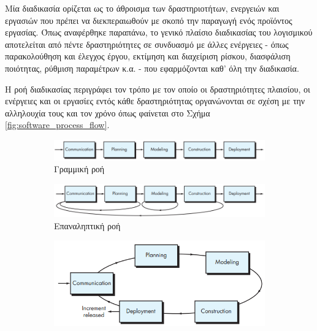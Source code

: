 Μία διαδικασία ορίζεται ως το άθροισμα των δραστηριοτήτων, ενεργειών και εργασιών που πρέπει να διεκπεραιωθούν με σκοπό την παραγωγή ενός προϊόντος εργασίας. Όπως αναφέρθηκε παραπάνω, το γενικό πλαίσιο διαδικασίας του λογισμικού αποτελείται από πέντε δραστηριότητες σε συνδυασμό με άλλες ενέργειες - όπως παρακολούθηση και έλεγχος έργου, εκτίμηση και διαχείριση ρίσκου, διασφάλιση ποιότητας, ρύθμιση παραμέτρων κ.α. - που εφαρμόζονται καθ' όλη την διαδικασία.

Η ροή διαδικασίας περιγράφει τον τρόπο με τον οποίο οι δραστηριότητες πλαισίου, οι ενέργειες και οι εργασίες εντός κάθε δραστηριότητας οργανώνονται σε σχέση με την αλληλουχία τους και τον χρόνο όπως φαίνεται στο Σχήμα \ref{fig:software_process_flow}.

\begin{figure}[h!]
    \begin{subfigure}{\linewidth}
        \centering
        \includegraphics[scale=0.5]{images/chapter2/software_engineering/linear_process_flow.png}
        \caption{Γραμμική ροή}
        \label{subfig:linear_flow}
    \end{subfigure}\par\medskip
    \begin{subfigure}{\linewidth}
        \centering
        \includegraphics[scale=0.5]{images/chapter2/software_engineering/iterative_process_flow.png}
        \caption{Επαναληπτική ροή}
        \label{subfig:iterative_flow}
    \end{subfigure}\par\medskip
    \begin{subfigure}{\linewidth}
        \centering
        \includegraphics[width=0.7\linewidth]{images/chapter2/software_engineering/evolutionery_process_flow.png}

\end{subfigure}
\end{figure}
